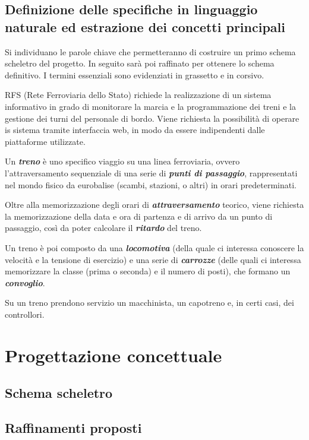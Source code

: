 \documentclass[a4paper,12pt]{report}
\begin{document}
	\section{Definizione delle specifiche in linguaggio naturale ed estrazione dei concetti principali}
	\par Si individuano le parole chiave che permetteranno di costruire un primo schema scheletro del progetto. In seguito sarà poi raffinato per ottenere lo schema definitivo. I termini essenziali sono evidenziati in grassetto e in corsivo.
	\par RFS (Rete Ferroviaria dello Stato) richiede la realizzazione di un sistema informativo in grado di monitorare la marcia e la programmazione dei treni e la gestione dei turni del personale di bordo. Viene richiesta la possibilità di operare is sistema tramite interfaccia web, in modo da essere indipendenti dalle piattaforme utilizzate.
	\par Un \textbf{\textit{treno}} è uno specifico viaggio su una linea ferroviaria, ovvero l'attraversamento sequenziale di una serie di \textbf{\textit{punti di passaggio}}, rappresentati nel mondo fisico da eurobalise (scambi, stazioni, o altri) in orari predeterminati.
	\par Oltre alla memorizzazione degli orari di \textbf{\textit{attraversamento}} teorico, viene richiesta la memorizzazione della data e ora di partenza e di arrivo da un punto di passaggio, così da poter calcolare il \textbf{\textit{ritardo}} del treno.
	\par Un treno è poi composto da una \textbf{\textit{locomotiva}} (della quale ci interessa conoscere la velocità e la tensione di esercizio) e una serie di \textbf{\textit{carrozze}} (delle quali ci interessa memorizzare la classe (prima o seconda) e il numero di posti), che formano un \textbf{\textit{convoglio}}.
	\par Su un treno prendono servizio un macchinista, un capotreno e, in certi casi, dei controllori.


	\chapter{Progettazione concettuale}
	\section{Schema scheletro}
	\section{Raffinamenti proposti}
\end{document}
